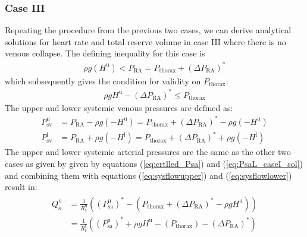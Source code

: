 \documentclass[12pt]{article}
\begin{document}
\subsubsection{Case III}
Repeating the procedure from the previous two cases, we can derive analytical solutions for heart rate and total reserve volume in case III where there is no venous collapse. The defining inequality for this case is 
\begin{align}
    \rho g (H^\text{u})<   P_\text{RA} = P_\text{thorax} + \left( \Delta P_\text{RA} \right)^*
\end{align}
which subsequently gives the condition for validity on $P_\text{thorax}$:
\begin{align}
    \rho g H^\text{u} - \left( \Delta P_\text{RA} \right)^* \leq P_\text{thorax}
\end{align}
The upper and lower systemic venous pressures are defined as:
\begin{align}
   P^\text{u}_\text{sv}&= P_\text{RA} - \rho g (-H^\text{u}) = P_{\text{thorax}} + \left(\Delta P_\text{RA} \right)^* - \rho g (-H^\text{u})\\
   P^\text{l}_\text{sv}&= P_\text{RA} + \rho g (-H^\text{l}) = P_{\text{thorax}}+ \left(\Delta P_\text{RA} \right)^* + \rho g (-H^\text{l})
\end{align}
The upper and lower systemic arterial pressures are the same as the other two cases as given by given by equations (\ref{eq:crtlled_Psa}) and (\ref{eq:PsaL_caseI_sol}) and combining them with equations  (\ref{eq:sysflowupper}) and (\ref{eq:sysflowlower}) result in: 
\begin{align}
\begin{split}
    Q_\text{s}^\text{u} &= \frac{1}{R_\text{s}^\text{u}}\left((P_\text{sa}^\text{u})^*-(P_\text{thorax} +(\Delta P_\text{RA})^* -\rho g H^\text{u}) \right) \\
    &= \frac{1}{R_\text{s}^\text{l}}\left((P_\text{sa}^\text{u})^* + \rho g H^\text{u} - (P_\text{thorax}) - (\Delta P_\text{RA})^*\right) 
\end{split}
\end{align}
\end{document}
